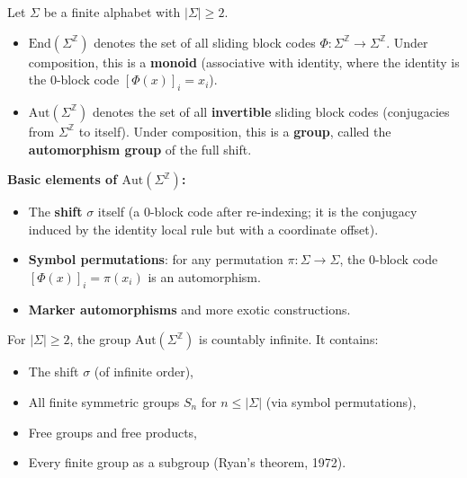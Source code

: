 \begin{definition}
Let $\Sigma$ be a finite alphabet with $|\Sigma| \geq 2$.
\end{definition}

\begin{itemize}
  \item $\text{End}(\Sigma^\mathbb{Z})$ denotes the set of all sliding block codes $\Phi: \Sigma^\mathbb{Z} \to \Sigma^\mathbb{Z}$. Under composition, this is a \textbf{monoid} (associative with identity, where the identity is the 0-block code $[\Phi(x)]_i = x_i$).
\end{itemize}

\begin{itemize}
  \item $\text{Aut}(\Sigma^\mathbb{Z})$ denotes the set of all \textbf{invertible} sliding block codes (conjugacies from $\Sigma^\mathbb{Z}$ to itself). Under composition, this is a \textbf{group}, called the \textbf{automorphism group} of the full shift.
\end{itemize}

\textbf{Basic elements of $\text{Aut}(\Sigma^\mathbb{Z})$:}

\begin{itemize}
  \item The \textbf{shift} $\sigma$ itself (a 0-block code after re-indexing; it is the conjugacy induced by the identity local rule but with a coordinate offset).
  \item \textbf{Symbol permutations}: for any permutation $\pi: \Sigma \to \Sigma$, the 0-block code $[\Phi(x)]_i = \pi(x_i)$ is an automorphism.
  \item \textbf{Marker automorphisms} and more exotic constructions.
\end{itemize}

\begin{theorem}[Hedlund, 1969]
For $|\Sigma| \geq 2$, the group $\text{Aut}(\Sigma^\mathbb{Z})$ is countably infinite. It contains:
\end{theorem}
\begin{itemize}
  \item The shift $\sigma$ (of infinite order),
  \item All finite symmetric groups $S_n$ for $n \leq |\Sigma|$ (via symbol permutations),
  \item Free groups and free products,
  \item Every finite group as a subgroup (Ryan's theorem, 1972).
\end{itemize}

